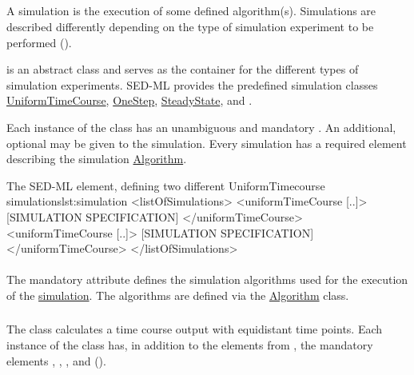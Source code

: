 \subsection{}
\label{class:simulation}
A simulation is the execution of some defined algorithm(s). Simulations are described differently depending on the type of simulation experiment to be performed (). 


 is an abstract class and serves as the container for the different types of simulation experiments. SED-ML \currentLV provides the predefined simulation classes \hyperref[class:uniformTimeCourse]{UniformTimeCourse}, \hyperref[class:oneStep]{OneStep}, \hyperref[class:steadyState]{SteadyState}, and \Analysis. 

Each instance of the  class has an unambiguous and mandatory \hyperref[sec:id]{}. An additional, optional \hyperref[sec:name]{} may be given to the simulation. Every simulation has a required element \hyperref[class:algorithm]{} describing the simulation \hyperref[class:algorithm]{Algorithm}.

\begin{myXmlLst}{The SED-ML  element, defining two different UniformTimecourse simulations}{lst:simulation}
<listOfSimulations>
	<uniformTimeCourse [..]>
		[SIMULATION SPECIFICATION]
	</uniformTimeCourse>
	<uniformTimeCourse [..]>
		[SIMULATION SPECIFICATION]
	</uniformTimeCourse>
</listOfSimulations>
\end{myXmlLst}

\paragraph*{}
\label{sec:algorithm}
The mandatory attribute  defines the simulation algorithms used for the execution of the \hyperref[class:simulation]{simulation}. The algorithms are defined via the \hyperref[class:algorithm]{Algorithm} class.


\subsubsection{}
\label{class:uniformTimeCourse}
The  class calculates a time course output with equidistant time points. Each instance of the  class has, in addition to the elements from \Simulation, the mandatory elements \hyperref[sec:initialTime]{}, \hyperref[sec:outputStartTime]{}, \hyperref[sec:outputEndTime]{}, and \hyperref[sec:numberOfSteps]{} ().

